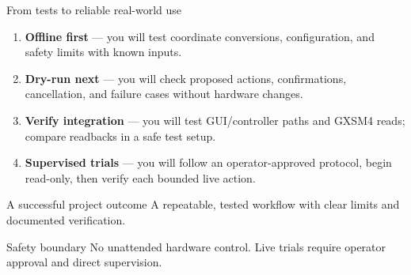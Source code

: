 \documentclass[aspectratio=169,11pt]{beamer}
\begin{document}
\begin{frame}{From tests to reliable real-world use}
  \footnotesize
  \setlength{\itemsep}{0.2em}
  \begin{enumerate}
    \item \textbf{Offline first} — you will test coordinate conversions, configuration, and safety limits with known inputs.
    \item \textbf{Dry-run next} — you will check proposed actions, confirmations, cancellation, and failure cases without hardware changes.
    \item \textbf{Verify integration} — you will test GUI/controller paths and GXSM4 reads; compare readbacks in a safe test setup.
    \item \textbf{Supervised trials} — you will follow an operator-approved protocol, begin read-only, then verify each bounded live action.
  \end{enumerate}
  \vspace{0.2em}
  \begin{block}{A successful project outcome}
    A repeatable, tested workflow with clear limits and documented verification.
  \end{block}
  \begin{alertblock}{Safety boundary}
    No unattended hardware control. Live trials require operator approval and direct supervision.
  \end{alertblock}
\end{frame}
\end{document}
